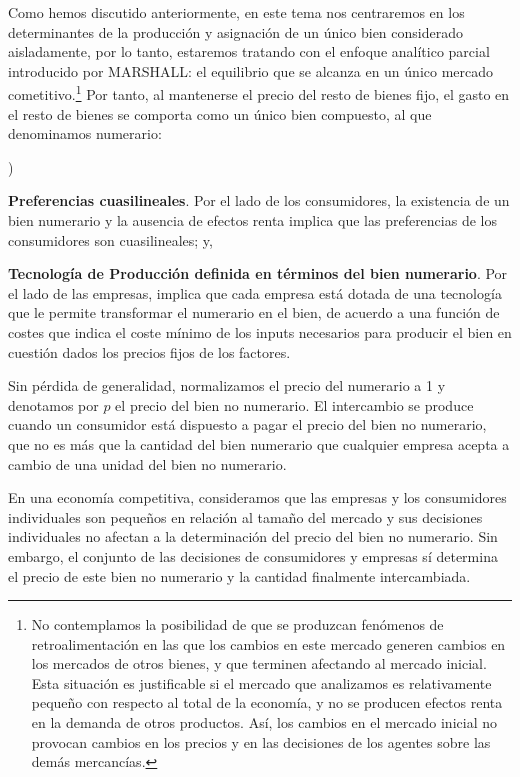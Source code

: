 \documentclass[10pt,a4paper]{article}
\newcounter{alphaitem}
\newenvironment{la}
      {\begin{list}{\alph{alphaitem})}{%
          \usecounter{alphaitem}%
          \setlength{\leftmargin}{1cm}%
          \setlength{\parskip}{3pt}%
          \setlength{\itemsep}{0pt}%
          \setlength{\parsep}{0pt}%
      }}
      {\end{list}}
\begin{document}
Como hemos discutido anteriormente, en este tema nos centraremos en los determinantes de la producción y asignación de un único bien considerado aisladamente, por lo tanto, estaremos tratando con el enfoque analítico parcial introducido por MARSHALL: el equilibrio que se alcanza en un único mercado cometitivo.\footnote{%
    No contemplamos la posibilidad de que se produzcan fenómenos de retroalimentación en las que los cambios en este mercado generen cambios en los mercados de otros bienes, y que terminen afectando al mercado inicial. Esta situación es justificable si el mercado que analizamos es relativamente pequeño con respecto al total de la economía, y no se producen efectos renta en la demanda de otros productos. Así, los cambios en el mercado inicial no provocan cambios en los precios y en las decisiones de los agentes sobre las demás mercancías.
} Por tanto, al mantenerse el precio del resto de bienes fijo, el gasto en el resto de bienes se comporta como un único bien compuesto, al que denominamos numerario:
\begin{la}
    \item \textbf{Preferencias cuasilineales}. Por el lado de los consumidores, la existencia de un bien numerario y la ausencia de efectos renta implica que las preferencias de los consumidores son cuasilineales; y,
    \item \textbf{Tecnología de Producción definida en términos del bien numerario}. Por el lado de las empresas, implica que cada empresa está dotada de una tecnología que le permite transformar el numerario en el bien, de acuerdo a una función de costes que indica el coste mínimo de los inputs necesarios para producir el bien en cuestión dados los precios fijos de los factores. 
\end{la}

Sin pérdida de generalidad, normalizamos el precio del numerario a 1 y denotamos por $p$ el precio del bien no numerario. El intercambio se produce cuando un consumidor está dispuesto a pagar el precio del bien no numerario, que no es más que la cantidad del bien numerario que cualquier empresa acepta a cambio de una unidad del bien no numerario.

En una economía competitiva, consideramos que las empresas y los consumidores individuales son pequeños en relación al tamaño del mercado y sus decisiones individuales no afectan a la determinación del precio del bien no numerario. Sin embargo, el conjunto de las decisiones de consumidores y empresas sí determina el precio de este bien no numerario y la cantidad finalmente intercambiada.
\end{document}
